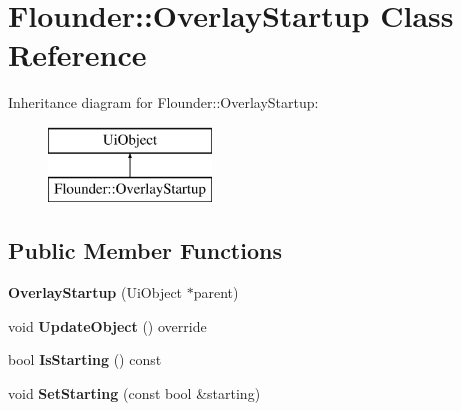 \hypertarget{class_flounder_1_1_overlay_startup}{}\section{Flounder\+:\+:Overlay\+Startup Class Reference}
\label{class_flounder_1_1_overlay_startup}
Inheritance diagram for Flounder\+:\+:Overlay\+Startup\+:\begin{figure}[H]
\begin{center}
\leavevmode
\includegraphics[height=2.000000cm]{class_flounder_1_1_overlay_startup}
\end{center}
\end{figure}
\subsection*{Public Member Functions}
\begin{DoxyCompactItemize}
\item 
\mbox{\label{class_flounder_1_1_overlay_startup_af57cdf5032dff2f918d6cf01010029e8}} 
{\bfseries Overlay\+Startup} (Ui\+Object $\ast$parent)
\item 
\mbox{\label{class_flounder_1_1_overlay_startup_a621420a0c13ca00cc8fabb6f982f1033}} 
void {\bfseries Update\+Object} () override
\item 
\mbox{\label{class_flounder_1_1_overlay_startup_a867da4fe2ac860986d91574fce64dfdd}} 
bool {\bfseries Is\+Starting} () const
\item 
\mbox{\label{class_flounder_1_1_overlay_startup_a6f038e54c335fc6fbde580d4dde9b84a}} 
void {\bfseries Set\+Starting} (const bool \&starting)
\end{DoxyCompactItemize}
